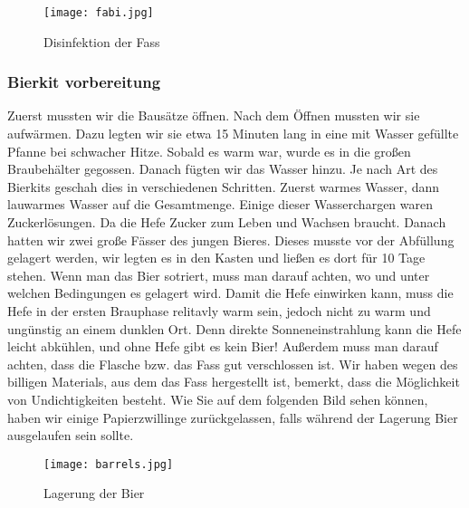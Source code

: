 \begin{figure}[!h]
	\centering
	\texttt{[image: fabi.jpg]}
	\caption{Disinfektion der Fass}
\end{figure}


\subsubsection{Bierkit vorbereitung}
Zuerst mussten wir die Bausätze öffnen. Nach dem Öffnen mussten wir sie aufwärmen. Dazu legten wir
sie etwa 15 Minuten lang in eine mit Wasser gefüllte Pfanne bei schwacher Hitze. Sobald es warm war,
wurde es in die großen Braubehälter gegossen. Danach fügten wir das Wasser hinzu. Je nach Art des Bierkits
geschah dies in verschiedenen Schritten. Zuerst warmes Wasser, dann lauwarmes Wasser auf die Gesamtmenge.
Einige dieser Wasserchargen waren Zuckerlösungen. Da die Hefe Zucker zum Leben und Wachsen braucht.
Danach hatten wir zwei große Fässer des jungen Bieres.
Dieses musste vor der Abfüllung gelagert werden, wir legten es in den Kasten und ließen es dort für 10 Tage stehen.
Wenn man das Bier sotriert, muss man darauf achten, wo und unter welchen Bedingungen es gelagert wird.
Damit die Hefe einwirken kann, muss die Hefe in der ersten Brauphase relitavly warm sein, jedoch nicht zu warm und ungünstig an einem dunklen Ort. 
Denn direkte Sonneneinstrahlung kann die Hefe leicht abkühlen, und ohne Hefe gibt es kein Bier!
Außerdem muss man darauf achten, dass die Flasche bzw. das Fass gut verschlossen ist. Wir haben wegen des billigen Materials,
aus dem das Fass hergestellt ist, bemerkt, dass die Möglichkeit von Undichtigkeiten besteht. Wie Sie auf dem folgenden Bild sehen können,
haben wir einige Papierzwillinge zurückgelassen, falls während der Lagerung Bier ausgelaufen sein sollte. \\



\begin{figure}[!h]
	\centering
	\texttt{[image: barrels.jpg]}
	\caption{Lagerung der Bier}
\end{figure}
\newpage

